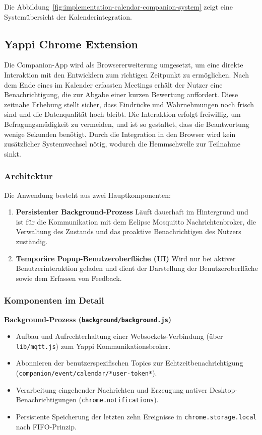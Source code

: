 \documentclass[12pt,a4paper]{report}
\begin{document}
        Die Abbildung~\ref{fig:implementation-calendar-companion-system} zeigt eine Systemübersicht der Kalenderintegration.

  \subsection{Yappi Chrome Extension}
      Die Companion-App wird als Browsererweiterung umgesetzt, um eine direkte Interaktion mit den Entwicklern zum richtigen
      Zeitpunkt zu ermöglichen. Nach dem Ende eines im Kalender erfassten Meetings erhält der Nutzer eine Benachrichtigung,
      die zur Abgabe einer kurzen Bewertung auffordert. Diese zeitnahe Erhebung stellt sicher, dass Eindrücke und Wahrnehmungen
      noch frisch sind und die Datenqualität hoch bleibt. Die Interaktion erfolgt freiwillig, um Befragungsmüdigkeit zu vermeiden,
      und ist so gestaltet, dass die Beantwortung wenige Sekunden benötigt. Durch die Integration in den Browser wird kein
      zusätzlicher Systemwechsel nötig, wodurch die Hemmschwelle zur Teilnahme sinkt.

    \subsubsection{Architektur}
        Die Anwendung besteht aus zwei Hauptkomponenten:
        \begin{enumerate}
          \item \textbf{Persistenter Background-Prozess}
                Läuft dauerhaft im Hintergrund und ist für die Kommunikation mit dem Eclipse Mosquitto Nachrichtenbroker, die Verwaltung des Zustands
                und das proaktive Benachrichtigen des Nutzers zuständig.
          \item \textbf{Temporäre Popup-Benutzeroberfläche (UI)}
                Wird nur bei aktiver Benutzerinteraktion geladen und dient der Darstellung der Benutzeroberfläche sowie dem Erfassen von Feedback.
        \end{enumerate}

    \subsubsection{Komponenten im Detail}
        \textbf{Background-Prozess (\texttt{background/background.js})} \\
            \begin{itemize}
              \item Aufbau und Aufrechterhaltung einer Websockets-Verbindung (über \texttt{lib/mqtt.js}) zum Yappi Kommunikationsbroker.
              \item Abonnieren der benutzerspezifischen Topics zur Echtzeitbenachrichtigung (\texttt{companion/event/calendar/*user-token*}).
              \item Verarbeitung eingehender Nachrichten und Erzeugung nativer Desktop-Benachrichtigungen (\texttt{chrome.notifications}).
              \item Persistente Speicherung der letzten zehn Ereignisse in \texttt{chrome.storage.local} nach FIFO-Prinzip.
            \end{itemize}
\end{document}
